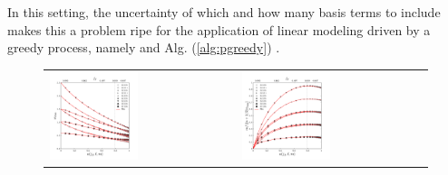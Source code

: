 \documentclass[twocolumn,aps,prd,floatfix,preprintnumbers,a4paper,nofootinbib,
superscriptaddress,10pt]{revtex4-1}
\begin{document}
%
%
\par In this setting, the uncertainty of which and how many basis terms to include makes this a problem ripe for the application of linear modeling driven by a greedy process, namely  and Alg. (\ref{alg:pgreedy}) .
%
%
\begin{figure}[htb]
  \begin{tabular}{ll}
    {\includegraphics[width=0.49\textwidth,trim={0 0.2in 0 0.4in},clip]{fits_w.pdf}} & {\includegraphics[width=0.49\textwidth,trim={0 0.2in 0 0.4in},clip]{fits_tau.pdf}}
    \\

\end{tabular}
\end{figure}
\end{document}
